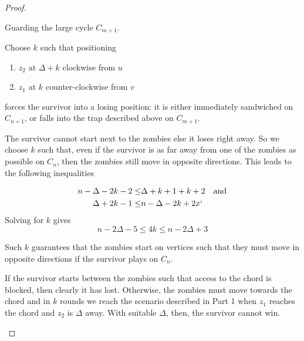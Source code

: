\begin{proof}
\begin{description}
  \item Guarding the large cycle $C_{m+1}$.\label{thm q_m_n 2}



  Choose $k$ such that positioning
  \begin{enumerate}
   \item $z_2$ at $\Delta + k$ clockwise from $u$
   \item $z_1$ at $k$ counter-clockwise from $v$
  \end{enumerate}
  forces the survivor into a losing position: it is either immediately sandwiched on $C_{n+1}$,
  or falls into the trap described above on $C_{m+1}$.

  The survivor cannot start next to the zombies else it loses right away.
  So we choose $k$ such that, even if the survivor is as far
  away from one of the zombies as possible on $C_n$, then the zombies
  still move in opposite directions. This leads to the following inequalities

  \begin{align*}
   n - \Delta - 2k - 2 \leq & \Delta + k +1 + k +2 & \text{and} \\
   \Delta + 2k -1 \leq      & n - \Delta -2k +2x`
  \end{align*}
  Solving for $k$ gives
  \[ n - 2\Delta -5 \leq 4k \leq n-2\Delta +3 \]

  Such $k$ guarantees that the zombies start on vertices such that they must
  move in opposite directions if the survivor plays on $C_n$.

  If the survivor starts between the zombies such that
  access to the chord is blocked, then clearly it has lost. Otherwise,
   the zombies must move towards the chord and in $k$ rounds we reach the
    scenario described in Part 1 when $z_1$ reaches the chord and $z_2$ is
    $\Delta$ away. With suitable $\Delta$, then, the survivor cannot win.






\end{description}
\end{proof}
